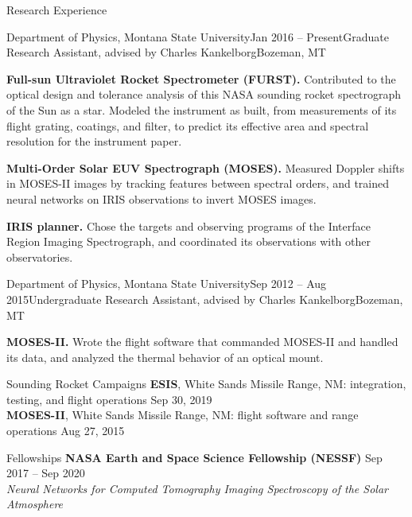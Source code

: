 \documentclass{resume}
\newcommand{\dated}[2]{\textbf{#1} \hfill {\fontseries{b}\selectfont #2}}
\begin{document}
\begin{rSection}{Research Experience}
\begin{rSubsection}{Department of Physics, Montana State University}{Jan 2016 -- Present}{Graduate Research Assistant, advised by Charles Kankelborg}{Bozeman, MT}
		\item \textbf{Full-sun Ultraviolet Rocket Spectrometer (FURST).}
		Contributed to the optical design and tolerance analysis of this NASA sounding rocket spectrograph of the Sun as a star.
		Modeled the instrument as built, from measurements of its flight grating, coatings, and filter, to predict its effective area and spectral resolution for the instrument paper.
		\item \textbf{Multi-Order Solar EUV Spectrograph (MOSES).}
		Measured Doppler shifts in MOSES-II images by tracking features between spectral orders, and trained neural networks on IRIS observations to invert MOSES images.
		\item \textbf{IRIS planner.} Chose the targets and observing programs of the Interface Region Imaging Spectrograph, and coordinated its observations with other observatories.
	\end{rSubsection}

	\begin{rSubsection}{Department of Physics, Montana State University}{Sep 2012 -- Aug 2015}{Undergraduate Research Assistant, advised by Charles Kankelborg}{Bozeman, MT}
		\small
		\item \textbf{MOSES-II.} Wrote the flight software that commanded MOSES-II and handled its data, and analyzed the thermal behavior of an optical mount.
	\end{rSubsection}

\end{rSection}

\begin{rSection}{Sounding Rocket Campaigns}
	\textbf{ESIS}, White Sands Missile Range, NM: integration, testing, and flight operations \hfill {\selectfont Sep 30, 2019}
	\\
	\textbf{MOSES-II}, White Sands Missile Range, NM: flight software and range operations \hfill {\selectfont Aug 27, 2015}
\end{rSection}

\begin{rSection}{Fellowships}
	\dated{NASA Earth and Space Science Fellowship (NESSF)}{Sep 2017 -- Sep 2020}
	\\
	\textit{Neural Networks for Computed Tomography Imaging Spectroscopy of the Solar Atmosphere}
\end{rSection}
\end{document}
